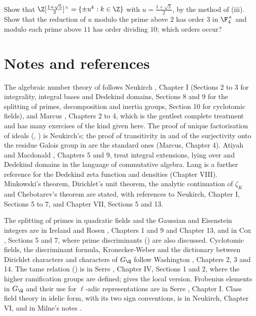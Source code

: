 \begin{exercise}\label{ex:ant:ex-unitsquad}
Show that $\Z[\frac{1+\sqrt5}2]^\times=\{\pm u^k:k\in\Z\}$ with $u=\frac{1+\sqrt5}2$, by the method of (iii). Show that the reduction of $u$
modulo the prime above $2$ has order $3$ in $\F_4^\times$ and modulo each prime above $11$ has order dividing $10$; which orders occur?
\end{exercise}

\section{Notes and references}\label{sec:ant:notes}

The algebraic number theory of  follows Neukirch \cite{Neukirch}, Chapter I (Sections 2 to 3 for integrality,
integral bases and Dedekind domains, Sections 8 and 9 for the splitting of primes, decomposition and inertia groups, Section 10 for cyclotomic fields), and
Marcus \cite{Marcus77}, Chapters 2 to 4, which is the gentlest complete treatment and has many exercises of the kind given here. The proof of unique
factorisation of ideals (, ) is Neukirch's; the proof of transitivity in
 and of the surjectivity onto the residue Galois group in  are the standard ones (Marcus, Chapter 4).
Atiyah and Macdonald \cite{AtiyahMacdonald}, Chapters 5 and 9, treat integral extensions, lying over and Dedekind domains in the language of commutative
algebra. Lang \cite{LangANT} is a further reference for the Dedekind zeta function and densities (Chapter VIII). Minkowski's theorem, Dirichlet's unit theorem,
the analytic continuation of $\zeta_K$ and Chebotarev's theorem are stated, with references to Neukirch, Chapter I, Sections 5 to 7, and Chapter VII, Sections 5 and
13.

The splitting of primes in quadratic fields and the Gaussian and Eisenstein integers are in Ireland and Rosen \cite{IrelandRosen}, Chapters 1 and 9 and
Chapter 13, and in Cox \cite{Cox}, Sections 5 and 7, where prime discriminants () are also discussed. Cyclotomic fields, the
discriminant formula, Kronecker-Weber and the dictionary between Dirichlet characters and characters of $G_\Q$ follow Washington \cite{Washington}, Chapters 2, 3
and 14. The tame relation () is in Serre \cite{SerreLocalFields}, Chapter IV, Sections 1 and 2, where the higher ramification groups are
defined;  gives the local version. Frobenius elements in $G_\Q$ and their use for $\ell$-adic representations are in Serre \cite{SerreAbelian},
Chapter I. Class field theory in idelic form, with its two sign conventions, is in Neukirch, Chapter VI, and in Milne's notes \cite{MilneCFT}.

